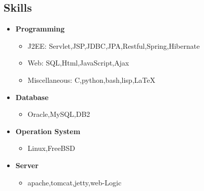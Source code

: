 \documentclass[a4paper,11pt]{res}
\begin{document}
\begin{resume}
  \section{Skills}
  \begin{itemize}
  \item{\bf Programming}
    \begin{itemize}
    \item J2EE: Servlet,JSP,JDBC,JPA,Restful,Spring,Hibernate
    \item Web: SQL,Html,JavaScript,Ajax
    \item Miscellaneous: C,python,bash,lisp,\LaTeX 
    \end{itemize}
  \item{\bf Database}
    \begin{itemize}
    \item Oracle,MySQL,DB2
    \end{itemize} 
  \item{\bf Operation System}
    \begin{itemize}
    \item Linux,FreeBSD
    \end{itemize} 
  \item{\bf Server}
    \begin{itemize}
    \item apache,tomcat,jetty,web-Logic
    \end{itemize} 
  \end{itemize}

\end{resume}
\end{document}
